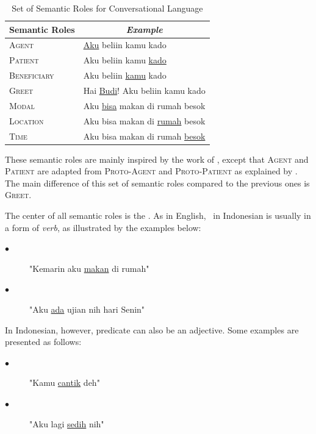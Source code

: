 \begin{table}
	\centering
	\caption{Set of Semantic Roles for Conversational Language}
	\label{tab:semantic_roles}
	\begin{tabular}{|l|l|}
		\hline
		\multicolumn{1}{|c|}{Semantic Roles} & \multicolumn{1}{c|}{\textit{Example}} \\
		\hline
		\textsc{Agent}		& \underline{Aku} beliin kamu kado\\
		\textsc{Patient}		& Aku beliin kamu \underline{kado}\\
		\textsc{Beneficiary}	& Aku beliin \underline{kamu} kado\\
		\textsc{Greet} 				& Hai \underline{Budi}! Aku beliin kamu kado\\
		\textsc{Modal} 				& Aku \underline{bisa} makan di rumah besok\\
		\textsc{Location} 			& Aku bisa makan di \underline{rumah} besok\\
		\textsc{Time} 				& Aku bisa makan di rumah \underline{besok} \\
		\hline
	\end{tabular}
\end{table}

These semantic roles are mainly inspired by the work of \cite{saeed19972003}, except that \textsc{Agent} and \textsc{Patient} are adapted from \textsc{Proto-Agent} and \textsc{Proto-Patient} as explained by \cite{dowty1991thematic}. The main difference of this set of semantic roles compared to the previous ones is \textsc{Greet}.

The center of all semantic roles is the \predicate. As in English, \predicate~in Indonesian is usually in a form of \textit{verb}, as illustrated by the examples below:
\begin{description}
	\item[$\bullet$] "Kemarin aku \underline{makan} di rumah"
	\item[$\bullet$] "Aku \underline{ada} ujian nih hari Senin"
\end{description}

In Indonesian, however, predicate can also be an adjective. Some examples are presented as follows:
\begin{description}
	\item[$\bullet$] "Kamu \underline{cantik} deh"
	\item[$\bullet$] "Aku lagi \underline{sedih} nih"
\end{description}

